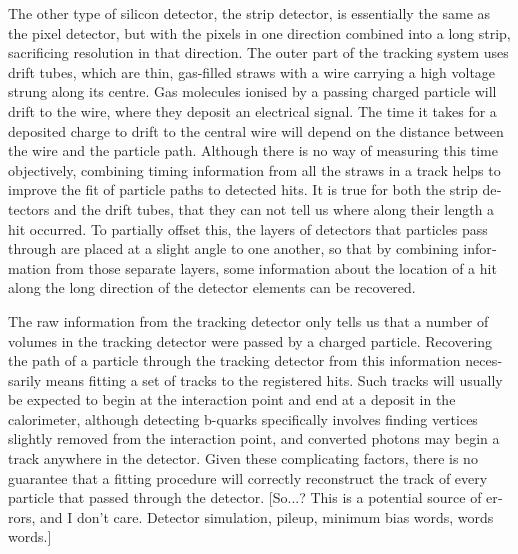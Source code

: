 \begin{english}
The other type of silicon detector, the strip detector, is essentially the same as the pixel detector, but with the pixels in one direction combined into a long strip, sacrificing resolution in that direction. The outer part of the tracking system uses drift tubes, which are thin, gas-filled straws with a wire carrying a high voltage strung along its centre. Gas molecules ionised by a passing charged particle will drift to the wire, where they deposit an electrical signal. The time it takes for a deposited charge to drift to the central wire will depend on the distance between the wire and the particle path. Although there is no way of measuring this time objectively, combining timing information from all the straws in a track helps to improve the fit of particle paths to detected hits. It is true for both the strip detectors and the drift tubes, that they can not tell us where along their length a hit occurred. To partially offset this, the layers of detectors that particles pass through are placed at a slight angle to one another, so that by combining information from those separate layers, some information about the location of a hit along the long direction of the detector elements can be recovered.

The raw information from the tracking detector only tells us that a number of volumes in the tracking detector were passed by a charged particle. Recovering the path of a particle through the tracking detector from this information necessarily means fitting a set of tracks to the registered hits. Such tracks will usually be expected to begin at the interaction point and end at a deposit in the calorimeter, although detecting b-quarks specifically involves finding vertices slightly removed from the interaction point, and converted photons may begin a track anywhere in the detector. Given these complicating factors, there is no guarantee that a fitting procedure will correctly reconstruct the track of every particle that passed through the detector. [So...? This is a potential source of errors, and I don't care. Detector simulation, pileup, minimum bias words, words words.]


\end{english}
